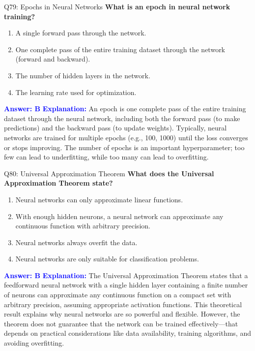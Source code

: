 \documentclass[8pt]{beamer}
\begin{document}
	\begin{frame}{Q79: Epochs in Neural Networks}
		\fontsize{6.5}{7.5}\selectfont
		\textbf{What is an epoch in neural network training?}
		\begin{enumerate}
			\item A single forward pass through the network.
			\item One complete pass of the entire training dataset through the network (forward and backward).
			\item The number of hidden layers in the network.
			\item The learning rate used for optimization.
		\end{enumerate}
		\vspace{0.1cm}
		\textcolor{blue}{\textbf{Answer: B}}
		\vspace{0.1cm}
		\textcolor{blue}{\textbf{Explanation:}} An epoch is one complete pass of the entire training dataset through the neural network, including both the forward pass (to make predictions) and the backward pass (to update weights). Typically, neural networks are trained for multiple epochs (e.g., 100, 1000) until the loss converges or stops improving. The number of epochs is an important hyperparameter; too few can lead to underfitting, while too many can lead to overfitting.
	\end{frame}
	
	\begin{frame}{Q80: Universal Approximation Theorem}
		\fontsize{6.5}{7.5}\selectfont
		\textbf{What does the Universal Approximation Theorem state?}
		\begin{enumerate}
			\item Neural networks can only approximate linear functions.
			\item With enough hidden neurons, a neural network can approximate any continuous function with arbitrary precision.
			\item Neural networks always overfit the data.
			\item Neural networks are only suitable for classification problems.
		\end{enumerate}
		\vspace{0.1cm}
		\textcolor{blue}{\textbf{Answer: B}}
		\vspace{0.1cm}
		\textcolor{blue}{\textbf{Explanation:}} The Universal Approximation Theorem states that a feedforward neural network with a single hidden layer containing a finite number of neurons can approximate any continuous function on a compact set with arbitrary precision, assuming appropriate activation functions. This theoretical result explains why neural networks are so powerful and flexible. However, the theorem does not guarantee that the network can be trained effectively—that depends on practical considerations like data availability, training algorithms, and avoiding overfitting.
	\end{frame}
	
\end{document}
